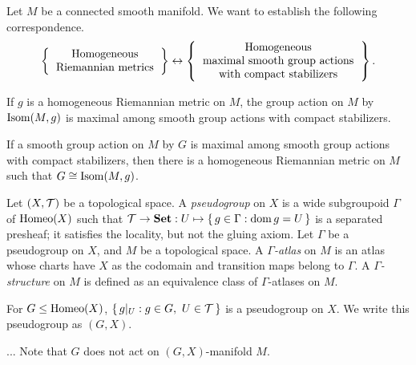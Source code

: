 \documentclass{../note}
\begin{document}
\begin{prb}
Let $M$ be a connected smooth manifold.
We want to establish the following correspondence.
\[\left\{\begin{tabular}{c}Homogeneous\\Riemannian metrics\end{tabular}\right\}\leftrightarrow\left\{\begin{tabular}{c}Homogeneous\\maximal smooth group actions\\with compact stabilizers\end{tabular}\right\}.\]
\begin{parts}
\item If $g$ is a homogeneous Riemannian metric on $M$, the group action on $M$ by $\operatorname{Isom}(M,g)$ is maximal among smooth group actions with compact stabilizers.
\item If a smooth group action on $M$ by $G$ is maximal among smooth group actions with compact stabilizers, then there is a homogeneous Riemannian metric on $M$ such that $G\cong\operatorname{Isom}(M,g)$.
\end{parts}
\end{prb}
\begin{pf}
\end{pf}

\begin{prb}
Let $(X,\mathcal{T})$ be a topological space.
A \emph{pseudogroup} on $X$ is a wide subgroupoid $\Gamma$ of $\operatorname{Homeo}(X)$ such that $\mathcal{T}\to\mathbf{Set}:U\mapsto\{\,g\in\Gamma:\operatorname{dom} g=U\,\}$ is a separated presheaf; it satisfies the locality, but not the gluing axiom.
Let $\Gamma$ be a pseudogroup on $X$, and $M$ be a topological space.
A \emph{$\Gamma$-atlas} on $M$ is an atlas whose charts have $X$ as the codomain and transition maps belong to $\Gamma$.
A \emph{$\Gamma$-structure} on $M$ is defined as an equivalence class of $\Gamma$-atlases on $M$.
\begin{parts}
\item For $G\le\operatorname{Homeo}(X)$, $\{\,g|_U:g\in G,\ U\in\mathcal{T}\,\}$ is a pseudogroup on $X$. We write this pseudogroup as $(G,X)$.
\item...
Note that $G$ does not act on $(G,X)$-manifold $M$.
\end{parts}
\end{prb}
\end{document}

